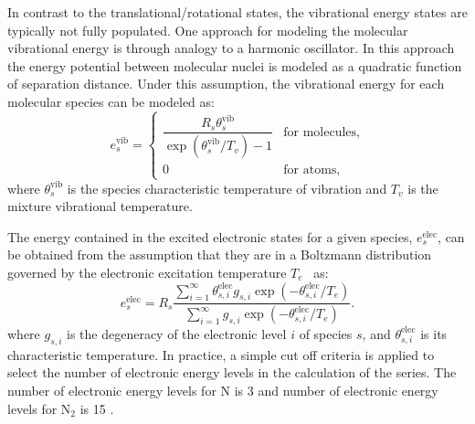 \documentclass[10pt]{article}
\newcommand{\elec}{\text{elec}}
\newcommand{\vib}{\text{vib}}
\begin{document}
In contrast to the translational/rotational states, the vibrational energy states are typically not fully populated. One approach for modeling the molecular vibrational energy is through analogy to a harmonic oscillator.  In this approach the energy potential between molecular nuclei is modeled as a quadratic function of separation distance.  Under this assumption, the vibrational energy for each molecular species can be modeled as:
\begin{equation}
  \label{eq:species_vibrational_energy}
  e^{\text{vib}}_s = 
  \begin{cases}    
    \dfrac{R_s\theta^{\vib}_{s}}{\exp\left(\theta^{\vib}_{s}/T_v\right) - 1} & \text{for molecules}, \\
    0 & \text{for atoms},
  \end{cases}
\end{equation}
where $\theta^{\vib}_{s}$ is the species characteristic temperature of vibration and $T_v$ is the mixture vibrational temperature.


The energy contained in the excited electronic states for a given species, $e^{\elec}_s$, can be obtained from the assumption that they are in a Boltzmann distribution governed by the electronic excitation temperature $T_e$~\citep{candler_thesis} as:
\begin{equation}
  \label{eq:elec_excitation}
  e^{\elec}_s = R_s \dfrac{\sum_{i=1}^\infty \theta^{\elec}_{s,i} g_{s,i} \exp\left(-\theta^{\elec}_{s,i}/T_e\right)}{ \sum_{i=1}^\infty g_{s,i} \exp\left(-\theta^{\elec}_{s,i}/T_e\right)}.
\end{equation}
where $g_{s,i}$ is the degeneracy of the electronic level $i$ of species $s$, and  $\theta^{\elec}_{s,i}$ is its characteristic temperature. In practice, a simple cut off criteria is applied to select the number of electronic energy levels in the calculation of the series. The number of electronic energy levels for N is 3 and number of electronic energy levels for N$_2$ is 15 \cite{dodod}.
\end{document}
